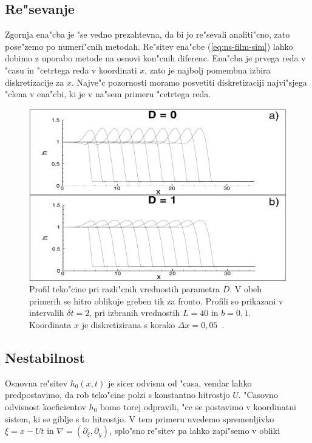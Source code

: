 \documentclass[a4paper,10pt]{article}
\begin{document}
\subsection{Re"sevanje}

Zgornja ena"cba je "se vedno prezahtevna, da bi jo re"sevali analiti"cno, zato pose"zemo po numeri"cnih metodah. Re"sitev ena"cbe (\ref{eq:ns-film-sim}) lahko dobimo z uporabo metode na osnovi kon"cnih diferenc. Ena"cba je prvega reda v "casu in "cetrtega reda v koordinati $x$, zato je najbolj pomembna izbira diskretizacije za $x$. Najve"c pozornosti moramo posvetiti diskretizaciji najvi"sjega "clena v ena"cbi, ki je v na"sem primeru "cetrtega reda. 

\begin{figure}[h]
 \centering
 \includegraphics[width=.8\textwidth]{./Slike/film-osnovna-resitev}
 \caption{Profil teko"cine pri razli"cnih vrednostih parametra $D$. V obeh primerih se hitro oblikuje greben tik za fronto. Profili so prikazani v intervalih $\delta t = 2$, pri izbranih vrednostih $L = 40$ in $b=0,1$. Koordinata $x$ je diskretizirana s korako $\Delta x = 0,05$~\cite{kondic}. }
 \label{fig:film-osnovna}
\end{figure}


\subsection{Nestabilnost}

Osnovna re"sitev $h_0(x, t)$ je sicer odvisna od "casa, vendar lahko predpostavimo, da rob teko"cine polzi s konstantno hitrostjo $U$. "Casovno odvisnost koeficientov $h_0$ bomo torej odpravili, "ce se postavimo v koordinatni sistem, ki se giblje s to hitrostjo. V tem primeru uvedemo spremenljivko $\xi = x - Ut$ in $\nabla = (\partial_\xi, \partial_y)$, splo"sno re"sitev pa lahko zapi"semo v obliki
\end{document}
